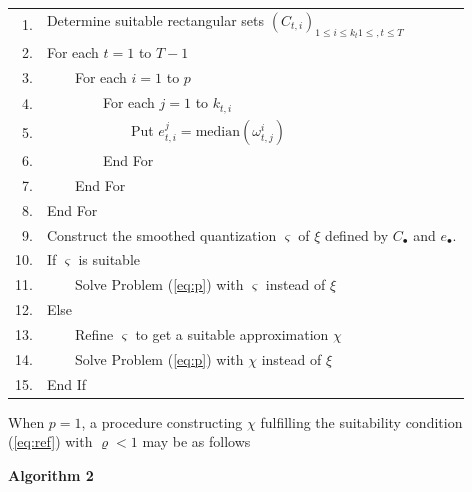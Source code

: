 \documentclass{article}              %
\begin{document}
\begin{tabular}{r|l}
1. &  Determine suitable rectangular sets $(C_{t,i})_{1\leq i\leq k_{t}1\leq,t\leq T}$

\\ 2. & For each $t=1$ to $T-1$

\\ 3. &$\qquad$For each $i=1$ to $p$

\\ 4. &$\qquad$$\qquad$For each $j=1$ to $k_{t,i}$

\\ 5. &$\qquad$$\qquad$$\qquad$Put $e_{t,i}^{j}=\mathrm{median}({\omega}^i_{t,j})$  


\\ 6. &$\qquad$$\qquad$End For

\\ 7. &$\qquad$End For

\\ 8. &End For

\\ 9. &Construct the smoothed quantization $\varsigma$ of $\xi$ defined by $C_\bullet$ and $e_\bullet$.

\\ 10. &If $\varsigma$ is suitable
	
\\ 11. &$\qquad$Solve Problem (\ref{eq:p}) with $\varsigma$ instead of $\xi$

\\ 12. &Else 

\\ 13. &$\qquad$Refine $\varsigma$ to get a suitable approximation $\chi$ 

\\ 14. &$\qquad$Solve Problem (\ref{eq:p}) with $\chi$ instead of $\xi$ 

\\ 15. &End If
\end{tabular}

\bigskip 

\noindent When $p=1$, a procedure constructing $\chi$ fulfilling the suitability condition (\ref{eq:ref}) with  $\varrho<1$ may be as follows

\bigskip 

{\bf Algorithm 2}

\bigskip
\end{document}
